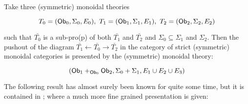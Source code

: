 \begin{lemma}[{\cite[??]{??}}]
Take three (symmetric) monoidal theories

$$T_0=({\sf Ob}_0,\Sigma_0 ,E_0 ), \ T_1=({\sf Ob}_1,\Sigma_1 ,E_1 ), \ T_2=({\sf Ob}_2,\Sigma_2 ,E_2 )$$

such that $\bar{T_0}$ is a sub-pro(p) of both $\bar{T_1}$ and $\bar{T_2}$ and $\Sigma_0 \subseteq \Sigma_1$ and $\Sigma_2$.
Then the pushout of the diagram $\bar{T_1} \leftarrow \bar{T_0} \rightarrow \bar{T_2}$  in the category of strict (symmetric) monoidal categories is presented by the (symmetric) monoidal theory:

$$
( {\sf Ob}_1 +_{{\sf Ob}_0} {\sf Ob}_2, \Sigma_0+\Sigma_1, E_1 \cup E_2 \cup E_3 )
$$

\end{lemma}


The following result has almost surely been known for quite some time, but it is contained in \cite[\S 3.2]{ih}; where a much more fine grained presentation is given:

